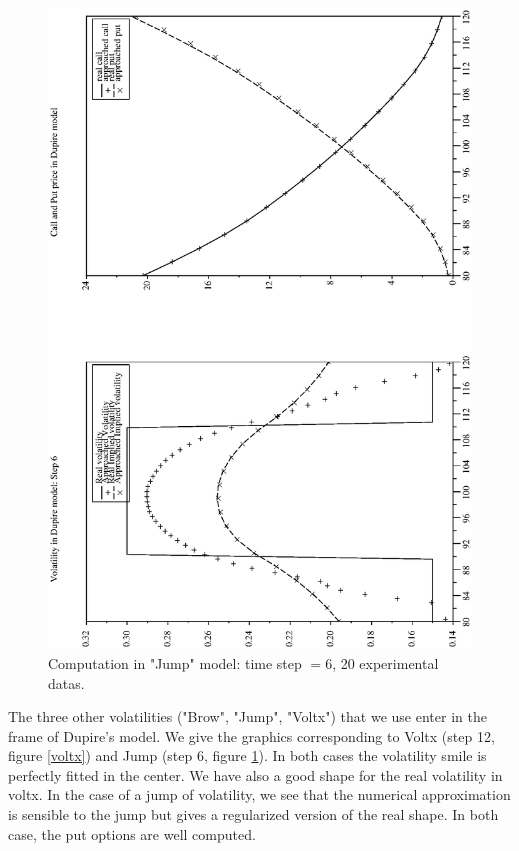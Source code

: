 \documentclass[a4paper]{article}
\begin{document}
\begin{figure}[tbp]
\begin{center}
\includegraphics[width=12.5cm]{ArticlePS/Saut6.eps}
\caption{Computation in "Jump" model: time step $=6$, 20
experimental datas.\label{Jump}}
\end{center}
\end{figure}

The three other volatilities ("Brow", "Jump", "Voltx") that we use
enter in the frame of Dupire's model. We give the graphics
corresponding to Voltx (step 12, figure \ref{voltx}) and Jump
(step 6, figure \ref{Jump}). In both cases the volatility smile is
perfectly fitted in the center. We have also a good shape for the
real volatility in voltx. In the case of a jump of volatility, we
see that the numerical approximation is sensible to the jump but
gives a regularized version of the real shape. In both case, the
put options are well computed.
\end{document}
